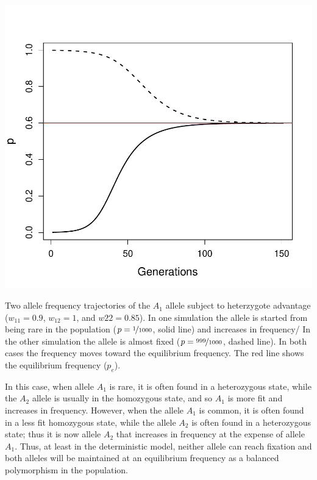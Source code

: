 \begin{marginfigure}
\begin{center}
  \includegraphics[width = \textwidth]{figures/het_advant_traj.pdf}
\end{center}
\caption{Two allele frequency trajectories of the $A_1$ allele subject to
  heterzygote advantage ($w_{11}=0.9$, $w_{12}=1$, and $w22=0.85$). In
one simulation the allele is started from being rare in the population
($p=\nicefrac{1}{1000}$, solid line) and increases in frequency/ In
the other simulation the allele is almost
fixed ($p=\nicefrac{999}{1000}$, dashed line). In both cases the
frequency moves toward the equilibrium frequency. The red line shows
the equilibrium frequency ($p_e$). } \label{fig:het_advant_traj}
\end{marginfigure}


In this case, when allele $A_1$ is rare, it is often found in a
heterozygous state, while the $A_2$ allele is usually in the
homozygous state, and so $A_1$ is more fit and increases in frequency. However, when
the allele $A_1$ is common, it is often found in a less fit homozygous state, while
the allele $A_2$ is often found in a heterozygous state; thus it is
now allele $A_2$ that increases in frequency at the expense of allele
$A_1$. Thus, at least in the deterministic model, neither allele can
reach fixation and both alleles will be maintained at an equilibrium frequency as a balanced
polymorphism in the population. 


